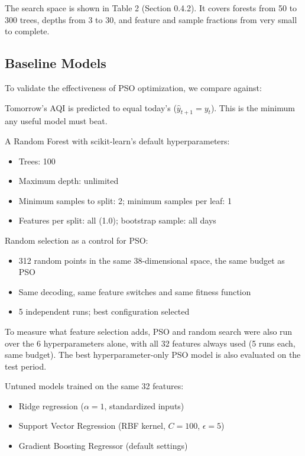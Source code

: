 The search space is shown in Table 2 (Section 0.4.2). It covers forests from 50 to 300 trees, depths from 3 to 30, and feature and sample fractions from very small to complete.

\subsection{Baseline Models}
To validate the effectiveness of PSO optimization, we compare against:

Tomorrow's AQI is predicted to equal today's ($\hat{y}_{t+1} = y_t$). This is the minimum any useful model must beat.

A Random Forest with scikit-learn's default hyperparameters:
\begin{itemize}
\item Trees: 100
\item Maximum depth: unlimited
\item Minimum samples to split: 2; minimum samples per leaf: 1
\item Features per split: all (1.0); bootstrap sample: all days
\end{itemize}

Random selection as a control for PSO:
\begin{itemize}
\item 312 random points in the same 38-dimensional space, the same budget as PSO
\item Same decoding, same feature switches and same fitness function
\item 5 independent runs; best configuration selected
\end{itemize}

To measure what feature selection adds, PSO and random search were also run over the 6 hyperparameters alone, with all 32 features always used (5 runs each, same budget). The best hyperparameter-only PSO model is also evaluated on the test period.

Untuned models trained on the same 32 features:
\begin{itemize}
\item Ridge regression ($\alpha = 1$, standardized inputs)
\item Support Vector Regression (RBF kernel, $C = 100$, $\epsilon = 5$)
\item Gradient Boosting Regressor (default settings)
\end{itemize}

